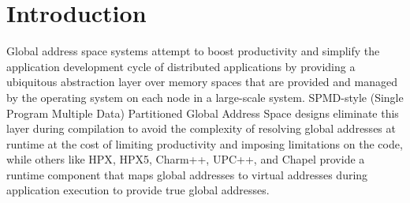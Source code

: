 \section{Introduction}
Global address space systems attempt to boost productivity and simplify the
application development cycle of distributed applications by providing a
ubiquitous abstraction layer over memory spaces that are provided and managed
by the operating system on each node in a large-scale system. SPMD-style (Single Program Multiple
Data) Partitioned Global Address Space designs eliminate this layer during
compilation to avoid the complexity of resolving global addresses at runtime at
the cost of limiting productivity and imposing limitations on the code, while
others like HPX\cite{Kaiser2014,hpx_repo}, HPX5\cite{hpx5},
Charm++\cite{Kale1993}, UPC++\cite{Zheng2014}, and Chapel\cite{chapel_lang} provide a
runtime component that maps global addresses to virtual addresses during
application execution to provide true global addresses.



